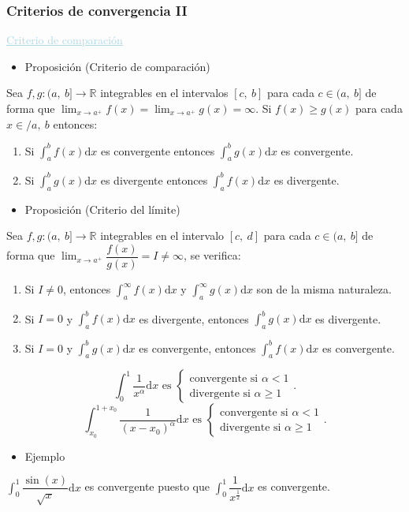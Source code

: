 \subsubsection{Criterios de convergencia II}
\textcolor{lightblue}{\underline{Criterio de comparación}}
\begin{itemize}[label=\color{red}\textbullet, leftmargin=*]
	\item \color{lightblue}Proposición (Criterio de comparación)
\end{itemize}
Sea $f,g:(a,~b]\rightarrow\mathbb{R}$ integrables en el intervalos $[c,~b]$ para cada $c\in(a,~b]$ de forma  que $\lim_{x\to a^+}f(x)=\lim_{x\to a^+}g(x)=\infty$. Si $f(x)\ge g(x)$ para cada $x\in/a,~b$ entonces:
\begin{enumerate}[label=\arabic*)]
	\item Si $\int_a^bf(x)\mathrm{d}x$ es convergente entonces $\int_a^bg(x)\mathrm{d}x$ es convergente.
	\item Si $\int_{a}^{b}g(x)\mathrm{d}x$ es divergente entonces $\int_{a}^{b}f(x)\mathrm{d}x$ es divergente.
\end{enumerate}
\begin{itemize}[label=\color{red}\textbullet, leftmargin=*]
	\item \color{lightblue}Proposición (Criterio del límite)
\end{itemize}
Sea $f,g:(a,~b]\rightarrow\mathbb{R}$ integrables en el intervalo $[c,~d]$ para cada $c\in(a,~b]$ de forma que $\lim_{x\to a^+}\dfrac{f(x)}{g(x)}=I\neq\infty$, se verifica:
\begin{enumerate}[label=\arabic*)]
	\item Si $I\neq0$, entonces $\int_{a}^{\infty}f(x)\mathrm{d}x$ y $\int_{a}^{\infty}g(x)\mathrm{d}x$ son de la misma naturaleza.
	\item Si $I=0$ y $\int_{a}^{b}f(x)\mathrm{d}x$ es divergente, entonces $\int_{a}^{b}g(x)\mathrm{d}x$ es divergente.
	\item Si $I=0$ y $\int_{a}^{b}g(x)\mathrm{d}x$ es convergente, entonces $\int_{a}^{b}f(x)\mathrm{d}x$ es convergente.
\end{enumerate}
\[ \int_{0}^{1}\dfrac{1}{x^\alpha}\mathrm{d}x\text{ es }\left\{\begin{array}{l}
	\text{convergente si }\alpha<1\\
	\text{divergente si }\alpha\ge1
\end{array}\right. . \] \[ \int_{x_0}^{1+x_0}\dfrac{1}{(x-x_0)^\alpha}\mathrm{d}x\text{ es }\left\{\begin{array}{l}
\text{convergente si }\alpha<1\\
\text{divergente si }\alpha\ge1
\end{array}\right. . \]
\begin{itemize}[label=\color{red}\textbullet, leftmargin=*]
	\item \color{lightblue} Ejemplo
\end{itemize}
$\int_{0}^{1}\dfrac{\sin(x)}{\sqrt{x}}\mathrm{d}x$ es convergente puesto que $\int_{0}^{1}\dfrac{1}{x^{\frac{1}{2}}}\mathrm{d}x$ es convergente.
